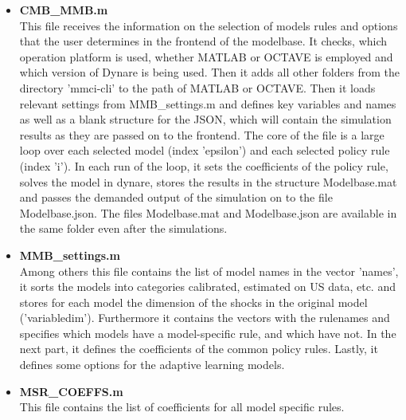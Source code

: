 \begin{itemize}
\item \textbf{CMB\_MMB.m}\\
This file receives the information on the selection of models rules and options that the user determines in the frontend of the modelbase. It checks, which operation platform is used, whether MATLAB or OCTAVE is employed and which version of Dynare is being used. Then it adds all other folders from the directory 'mmci-cli' to the path of MATLAB or OCTAVE. Then it loads relevant settings from MMB\_settings.m and defines key variables and names as well as a blank structure for the JSON, which will contain the simulation results as they are passed on to the frontend. The core of the file is a large loop over each selected model (index 'epsilon') and each selected policy rule (index 'i'). In each run of the loop, it sets the coefficients of the policy rule, solves the model in dynare, stores the results in the structure Modelbase.mat and passes the demanded output of the simulation on to the file Modelbase.json. The files Modelbase.mat and Modelbase.json are available in the same folder even after the simulations.
\item \textbf{MMB\_settings.m}\\
Among others this file contains the list of model names in the vector 'names', it sorts the models into categories calibrated, estimated on US data, etc. and stores for each model the dimension of the shocks in the original model ('variabledim'). Furthermore it contains the vectors with the rulenames and specifies which models have a model-specific rule, and which have not. In the next part, it defines the coefficients of the common policy rules. Lastly, it defines some options for the adaptive learning models.
\item \textbf{MSR\_COEFFS.m}\\
This file contains the list of coefficients for all model specific rules.
\end{itemize}



